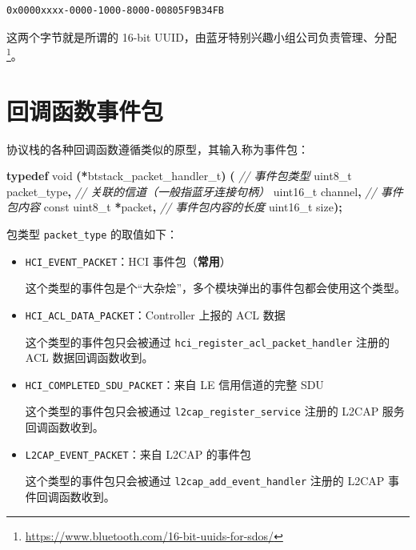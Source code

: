 \documentclass[
  12pt,
]{book}
\newenvironment{Shaded}{\begin{snugshade}}{\end{snugshade}}
\newcommand{\CommentTok}[1]{\textcolor[rgb]{0.56,0.35,0.01}{\textit{#1}}}
\newcommand{\DataTypeTok}[1]{\textcolor[rgb]{0.13,0.29,0.53}{#1}}
\newcommand{\KeywordTok}[1]{\textcolor[rgb]{0.13,0.29,0.53}{\textbf{#1}}}
\newcommand{\NormalTok}[1]{#1}
\newcommand{\OperatorTok}[1]{\textcolor[rgb]{0.81,0.36,0.00}{\textbf{#1}}}
\begin{document}
\begin{verbatim}
0x0000xxxx-0000-1000-8000-00805F9B34FB
\end{verbatim}

这两个字节就是所谓的 16-bit UUID，由蓝牙特别兴趣小组公司负责管理、分配\footnote{\url{https://www.bluetooth.com/16-bit-uuids-for-sdos/}}。

\hypertarget{ux56deux8c03ux51fdux6570ux4e8bux4ef6ux5305}{%
\section{回调函数事件包}\label{ux56deux8c03ux51fdux6570ux4e8bux4ef6ux5305}}

协议栈的各种回调函数遵循类似的原型，其输入称为事件包：

\begin{Shaded}
\begin{Highlighting}[]
\KeywordTok{typedef} \DataTypeTok{void} \OperatorTok{(*}\NormalTok{btstack\_packet\_handler\_t}\OperatorTok{)} \OperatorTok{(}
    \CommentTok{// 事件包类型}
    \DataTypeTok{uint8\_t}\NormalTok{ packet\_type}\OperatorTok{,}
    \CommentTok{// 关联的信道（一般指蓝牙连接句柄）}
    \DataTypeTok{uint16\_t}\NormalTok{ channel}\OperatorTok{,}
    \CommentTok{// 事件包内容}
    \DataTypeTok{const} \DataTypeTok{uint8\_t} \OperatorTok{*}\NormalTok{packet}\OperatorTok{,}
    \CommentTok{// 事件包内容的长度}
    \DataTypeTok{uint16\_t}\NormalTok{ size}\OperatorTok{);}
\end{Highlighting}
\end{Shaded}

包类型 \texttt{packet\_type} 的取值如下：

\begin{itemize}
\item
  \texttt{HCI\_EVENT\_PACKET}：HCI 事件包（\textbf{常用}）

  这个类型的事件包是个``大杂烩''，多个模块弹出的事件包都会使用这个类型。
\item
  \texttt{HCI\_ACL\_DATA\_PACKET}：Controller 上报的 ACL 数据

  这个类型的事件包只会被通过 \texttt{hci\_register\_acl\_packet\_handler} 注册的 ACL 数据回调函数收到。
\item
  \texttt{HCI\_COMPLETED\_SDU\_PACKET}：来自 LE 信用信道的完整 SDU

  这个类型的事件包只会被通过 \texttt{l2cap\_register\_service} 注册的 L2CAP 服务回调函数收到。
\item
  \texttt{L2CAP\_EVENT\_PACKET}：来自 L2CAP 的事件包

  这个类型的事件包只会被通过 \texttt{l2cap\_add\_event\_handler} 注册的 L2CAP 事件回调函数收到。
\end{itemize}
\end{document}
